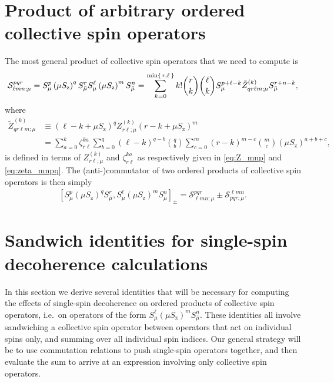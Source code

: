 \documentclass[aps,pra,twocolumn,longbibliography]{revtex4-2}
\newcommand{\p}[1]{\left( #1 \right)} %
\renewcommand{\sp}[1]{\left[ #1 \right]} %
\renewcommand{\S}{\mathcal{S}}
\newcommand{\z}{\text{z}}
\newcommand{\bmu}{{\bar\mu}}
\newcommand{\1}{\mathds{1}}
\begin{document}
\section{Product of arbitrary ordered collective spin operators}
\label{sec:general_product}

The most general product of collective spin operators that we need to
compute is
\begin{align}
  \S^{pqr}_{\ell mn;\mu}
  = S_\mu^p \p{\mu S_\z}^q S_\bmu^r
  S_\mu^\ell \p{\mu S_\z}^m S_\bmu^n
  = \sum_{k=0}^{\min\set{r,\ell}} k! { r \choose k } { \ell \choose k }
  S_\mu^{p+\ell-k} \tilde Z_{qr\ell m;\mu}^{(k)} S_\bmu^{r+n-k},
  \label{eq:general_product}
\end{align}
where
\begin{align}
  \tilde Z_{qr\ell m;\mu}^{(k)}
  &\equiv \p{\ell-k+\mu S_\z}^q
  Z_{r\ell;\mu}^{(k)} \p{r-k+\mu S_\z}^m \\
  &= \sum_{a=0}^k \zeta_{r\ell}^{ka}
  \sum_{b=0}^q \p{\ell-k}^{q-b} { q \choose b }
  \sum_{c=0}^m \p{r-k}^{m-c} { m \choose c }
  \p{\mu S_\z}^{a+b+c},
\end{align}
is defined in terms of $Z_{r\ell;\mu}^{(k)}$ and $\zeta_{r\ell}^{ka}$
as respectively given in \eqref{eq:Z_mnp} and \eqref{eq:zeta_mnpq}.
The (anti-)commutator of two ordered products of collective spin
operators is then simply
\begin{align}
  \sp{S_\mu^p \p{\mu S_\z}^q S_\bmu^r,
    S_\mu^\ell \p{\mu S_\z}^m S_\bmu^n}_\pm
  = \S^{pqr}_{\ell mn;\mu} \pm \S^{\ell mn}_{pqr;\mu}.
\end{align}

\section{Sandwich identities for single-spin decoherence calculations}
\label{sec:sandwich_single}

In this section we derive several identities that will be necessary
for computing the effects of single-spin decoherence on ordered
products of collective spin operators, i.e.~on operators of the form
$S_\mu^\ell \p{\mu S_\z}^m S_\bmu^n$.  These identities all involve
sandwiching a collective spin operator between operators that act on
individual spins only, and summing over all individual spin indices.
Our general strategy will be to use commutation relations to push
single-spin operators together, and then evaluate the sum to arrive at
an expression involving only collective spin operators.
\end{document}
